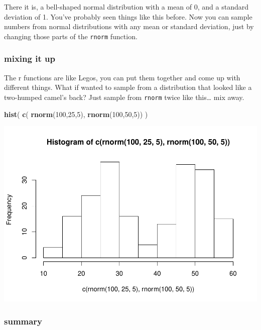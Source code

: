 \documentclass[]{book}
\newenvironment{Shaded}{\begin{snugshade}}{\end{snugshade}}
\newcommand{\KeywordTok}[1]{\textcolor[rgb]{0.13,0.29,0.53}{\textbf{#1}}}
\newcommand{\DecValTok}[1]{\textcolor[rgb]{0.00,0.00,0.81}{#1}}
\newcommand{\NormalTok}[1]{#1}
\begin{document}
There it is, a bell-shaped normal distribution with a mean of 0, and a
standard deviation of 1. You've probably seen things like this before.
Now you can sample numbers from normal distributions with any mean or
standard deviation, just by changing those parts of the \texttt{rnorm}
function.

\subsubsection{mixing it up}\label{mixing-it-up}

The r functions are like Legos, you can put them together and come up
with different things. What if wanted to sample from a distribution that
looked like a two-humped camel's back? Just sample from \texttt{rnorm}
twice like this\ldots{} mix away.

\begin{Shaded}
\begin{Highlighting}[]
\KeywordTok{hist}\NormalTok{( }\KeywordTok{c}\NormalTok{( }\KeywordTok{rnorm}\NormalTok{(}\DecValTok{100}\NormalTok{,}\DecValTok{25}\NormalTok{,}\DecValTok{5}\NormalTok{), }\KeywordTok{rnorm}\NormalTok{(}\DecValTok{100}\NormalTok{,}\DecValTok{50}\NormalTok{,}\DecValTok{5}\NormalTok{)) )}
\end{Highlighting}
\end{Shaded}

\includegraphics{Statistics_Lab_files/figure-latex/unnamed-chunk-114-1.pdf}

\subsubsection{summary}\label{summary}
\end{document}

